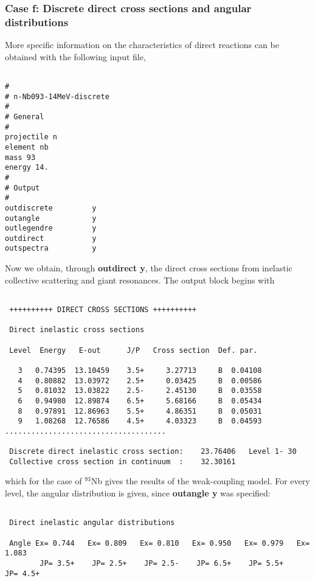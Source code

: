 \begin{samplecase}
\subsubsection{Case f: Discrete direct cross sections and angular 
distributions}
More specific information on the characteristics of direct reactions can be 
obtained with the following input file,

{\small \begin{verbatim}

#
# n-Nb093-14MeV-discrete
#
# General
#
projectile n
element nb
mass 93
energy 14.
#
# Output
#
outdiscrete         y
outangle            y     
outlegendre         y     
outdirect           y
outspectra          y
\end{verbatim} } \renewcommand{\baselinestretch}{1.07}\small\normalsize
\noindent
Now we obtain, through {\bf outdirect y}, the direct cross sections from 
inelastic collective scattering and giant resonances. The output block
begins with

{\small \begin{verbatim}

 ++++++++++ DIRECT CROSS SECTIONS ++++++++++

 Direct inelastic cross sections

 Level  Energy   E-out      J/P   Cross section  Def. par.

   3   0.74395  13.10459    3.5+     3.27713     B  0.04108
   4   0.80882  13.03972    2.5+     0.03425     B  0.00586
   5   0.81032  13.03822    2.5-     2.45130     B  0.03558
   6   0.94980  12.89874    6.5+     5.68166     B  0.05434
   8   0.97891  12.86963    5.5+     4.86351     B  0.05031
   9   1.08268  12.76586    4.5+     4.03323     B  0.04593
.....................................
  
 Discrete direct inelastic cross section:    23.76406   Level 1- 30
 Collective cross section in continuum  :    32.30161
\end{verbatim} } \renewcommand{\baselinestretch}{1.07}\small\normalsize
\noindent
which for the case of ${}^{93}$Nb gives the results of the weak-coupling 
model. For every level, the angular distribution is given, since
{\bf outangle y} was specified:

{\small \begin{verbatim}

 Direct inelastic angular distributions

 Angle Ex= 0.744   Ex= 0.809   Ex= 0.810   Ex= 0.950   Ex= 0.979   Ex= 1.083   
        JP= 3.5+    JP= 2.5+    JP= 2.5-    JP= 6.5+    JP= 5.5+    JP= 4.5+   


\end{verbatim}}
\end{samplecase}
